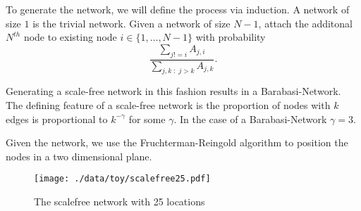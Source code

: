 \documentclass[11pt]{article}
\begin{document}
To generate the network, we will define the process via induction.  A
network of size $1$ is the trivial network.  Given a network of size
$N-1$, attach the additonal $N^{th}$ node to existing node $i \in
\lbrace 1,\ldots,N-1\rbrace$ with probability
\begin{equation*}
  \frac{\sum_{j!=i} A_{j,i}}{\sum_{j,k \;:\; j > k} A_{j,k}}.
\end{equation*}

Generating a scale-free network in this fashion results in a
Barabasi-Network.  The defining feature of a scale-free network is the
proportion of nodes with $k$ edges is proportional to $k^{-\gamma}$
for some $\gamma$.  In the case of a Barabasi-Network $\gamma = 3$.

Given the network, we use the Fruchterman-Reingold algorithm to
position the nodes in a two dimensional plane.


\begin{figure}[htb]
\centering
\texttt{[image: ./data/toy/scalefree25.pdf]}
\caption{\label{fig:scalefree25}The scalefree network with 25 locations}
\end{figure}
\end{document}
